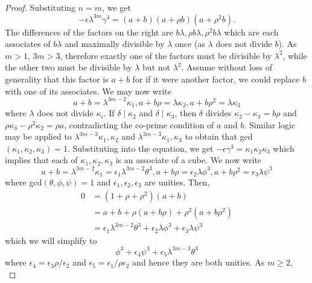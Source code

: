 \documentclass{article}
\theoremstyle{definition}
\theoremstyle{definition}
\theoremstyle{definition}
\begin{document}
    \begin{proof}
        Substituting $n=m$, we get $$-\epsilon\lambda^{3m}\gamma^3=(a+b)(a+\rho b)(a+\rho^2b).$$ The differences of the factors on the right are $b\lambda, \rho b\lambda,\rho^2b\lambda$ which are each associates of $b\lambda$ and maximally divisible by $\lambda$ once (as $\lambda$ does not divide $b$). As $m>1$, $3m>3$, therefore exactly one of the factors must be divisible by $\lambda^2$, while the other two must be divisible by $\lambda$ but not $\lambda^2$. Assume without loss of generality that this factor is $a+b$ for if it were another factor, we could replace $b$ with one of its associates. 
       \newline\newline 
        We may now write $$a+b=\lambda^{3m-2}\kappa_1, a+b\rho=\lambda\kappa_2, a+b\rho^2=\lambda\kappa_3$$ where $\lambda$ does not divide $\kappa_i$. If $\delta\mid \kappa_2$ and $\delta\mid \kappa_3$, then $\delta$ divides $\kappa_2-\kappa_3=b\rho$ and $\rho\kappa_3-\rho^2\kappa_2=\rho a$, contradicting the co-prime condition of $a$ and $b$. Similar logic may be applied to $\lambda^{3m-3}\kappa_1, \kappa_2$ and $\lambda^{3m-3}\kappa_1, \kappa_3$ to obtain that gcd$(\kappa_1,\kappa_2,\kappa_3)=1$. Substituting into the equation, we get $-\epsilon\gamma^3=\kappa_1\kappa_2\kappa_3$ which implies that each of $\kappa_1,\kappa_2,\kappa_3$ is an associate of a cube.
        \newline\newline
        We now write $$a+b=\lambda^{3m-2}\kappa_1=\epsilon_1\lambda^{3m-2}\theta^3, a+b\rho=\epsilon_2\lambda\phi^3, a+b\rho^2=\epsilon_3\lambda\psi^3$$ where gcd$(\theta,\phi,\psi)=1$ and $\epsilon_1,\epsilon_2,\epsilon_3$ are unities. 
        \newline\newline
        Then, \begin{align*}
0 &= (1 + \rho + \rho^2)(a + b) \\
  &= a + b + \rho(a + b\rho) + \rho^2(a + b\rho^2) \\
  &= \epsilon_1 \lambda^{3m - 2} \theta^3 + \epsilon_2 \lambda \phi^3 + \epsilon_3 \lambda \psi^3
\end{align*} which we will simplify to $$\phi^3+\epsilon_4\psi^3+\epsilon_5\lambda^{3m-3}\theta^3$$ where $\epsilon_4=\epsilon_3\rho/\epsilon_2$ and $\epsilon_5=\epsilon_1/\rho\epsilon_2$ and hence they are both unities. 
\newline\newline
As $m\geq2$, $$
$$
\end{proof}
\end{document}
